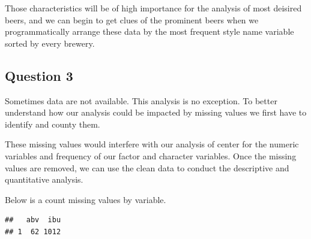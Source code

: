 \documentclass[]{article}
\newenvironment{Shaded}{\begin{snugshade}}{\end{snugshade}}
\newcommand{\KeywordTok}[1]{\textcolor[rgb]{0.13,0.29,0.53}{\textbf{#1}}}
\newcommand{\DataTypeTok}[1]{\textcolor[rgb]{0.13,0.29,0.53}{#1}}
\newcommand{\StringTok}[1]{\textcolor[rgb]{0.31,0.60,0.02}{#1}}
\newcommand{\CommentTok}[1]{\textcolor[rgb]{0.56,0.35,0.01}{\textit{#1}}}
\newcommand{\ControlFlowTok}[1]{\textcolor[rgb]{0.13,0.29,0.53}{\textbf{#1}}}
\newcommand{\OperatorTok}[1]{\textcolor[rgb]{0.81,0.36,0.00}{\textbf{#1}}}
\newcommand{\NormalTok}[1]{#1}
\begin{document}
Those characteristics will be of high importance for the analysis of
most deisired beers, and we can begin to get clues of the prominent
beers when we programmatically arrange these data by the most frequent
style name variable sorted by every brewery.

\begin{Shaded}
\end{Shaded}

\subsection{Question 3}\label{question-3}

Sometimes data are not available. This analysis is no exception. To
better understand how our analysis could be impacted by missing values
we first have to identify and county them.

These missing values would interfere with our analysis of center for the
numeric variables and frequency of our factor and character variables.
Once the missing values are removed, we can use the clean data to
conduct the descriptive and quantitative analysis.

Below is a count missing values by variable.

\begin{Shaded}
\end{Shaded}

\begin{verbatim}
##   abv  ibu
## 1  62 1012
\end{verbatim}
\end{document}
